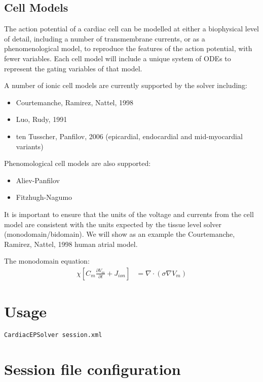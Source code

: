 \subsection{Cell Models}
The action potential of a cardiac cell can be modelled at either a biophysical
level of detail, including a number of transmembrane currents, or as a
phenomenological model, to reproduce the features of the action potential, with
fewer variables. Each cell model will include a unique system of ODEs to
represent the gating variables of that model.

A number of ionic cell models are currently supported by the solver including:
\begin{itemize}
    \item Courtemanche, Ramirez, Nattel, 1998 
    \item Luo, Rudy, 1991
    \item ten Tusscher, Panfilov, 2006 (epicardial, endocardial and
    mid-myocardial variants)
\end{itemize}

Phenomological cell models are also supported:
\begin{itemize}
    \item Aliev-Panfilov
    \item Fitzhugh-Nagumo
\end{itemize}

It is important to ensure that the units of the voltage and currents from the
cell model are consistent with the units expected by the tissue level solver
(monodomain/bidomain). We will show as an example the Courtemanche, Ramirez,
Nattel, 1998 human atrial model.

The monodomain equation:
\begin{align*}
\chi \left[ C_m \frac{\partial V_m}{\partial t} + J_{ion} \right] &= \nabla \cdot (\sigma \nabla V_m)
\end{align*}

\section{Usage}

\begin{lstlisting}[style=BashInputStyle]
CardiacEPSolver session.xml
\end{lstlisting}

\section{Session file configuration}
